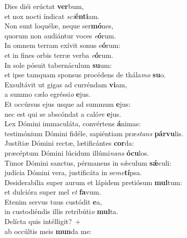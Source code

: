 \evenverse Dies diéi erúctat \textbf{ver}bum,~\*\\
\evenverse et nox nocti índicat \textit{sci}\textbf{én}\textbf{ti}am.\\
\oddverse Non sunt loquélæ, neque ser\textbf{mó}nes,~\*\\
\oddverse quorum non audiántur voces \textit{e}\textbf{ó}rum.\\
\evenverse In omnem terram exívit sonus e\textbf{ó}rum:~\*\\
\evenverse et in fines orbis terræ verba \textit{e}\textbf{ó}rum.\\
\oddverse In sole pósuit tabernáculum \textbf{su}um:~\*\\
\oddverse et ipse tamquam sponsus procédens de thála\textit{mo} \textbf{su}o.\\
\evenverse Exsultávit ut gigas ad curréndam \textbf{vi}am,~\*\\
\evenverse a summo cælo egréssi\textit{o} \textbf{e}jus.\\
\oddverse Et occúrsus ejus usque ad summum \textbf{e}jus:~\*\\
\oddverse nec est qui se abscóndat a caló\textit{re} \textbf{e}jus.\\
\evenverse Lex Dómini immaculáta, convértens \textbf{á}nimas:~\*\\
\evenverse testimónium Dómini fidéle, sapiéntiam præ\textit{stans} \textbf{pár}\textbf{vu}lis.\\
\oddverse Justítiæ Dómini rectæ, lætificántes \textbf{cor}da:~\*\\
\oddverse præcéptum Dómini lúcidum illúmi\textit{nans} \textbf{ó}\textbf{cu}los.\\
\evenverse Timor Dómini sanctus, pérmanens in sǽculum \textbf{sǽ}culi:~\*\\
\evenverse judícia Dómini vera, justificáta in se\textit{me}\textbf{tí}psa.\\
\oddverse Desiderabília super aurum et lápidem pretiósum \textbf{mul}tum:~\*\\
\oddverse et dulcióra super mel \textit{et} \textbf{fa}vum.\\
\evenverse Etenim servus tuus custódit \textbf{e}a,~\*\\
\evenverse in custodiéndis illis retribúti\textit{o} \textbf{mul}ta.\\
\oddverse Delícta quis intélligit?~+\\
\oddverse  ab occúltis meis \textbf{mun}da me:~\*\\
